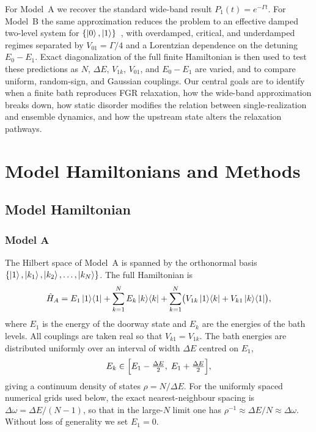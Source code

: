 \documentclass[aps,prx,reprint,showpacs,showkeys,floatfix]{revtex4-2}
\begin{document}
For Model~A we recover the standard wide-band result
$P_1(t)=e^{-\Gamma t}$.  For Model~B the same approximation reduces the
problem to an effective damped two-level system for
$\{\ket{0},\ket{1}\}$~\cite{CohenTannoudji1997}, with overdamped, critical,
and underdamped regimes separated by $V_{01}=\Gamma/4$ and a Lorentzian
dependence on the detuning $E_0-E_1$.  Exact diagonalization of the full
finite Hamiltonian is then used to test these predictions as $N$,
$\Delta E$, $V_{1k}$, $V_{01}$, and $E_0-E_1$ are varied, and to compare
uniform, random-sign, and Gaussian couplings.  Our central goals are to
identify when a finite bath reproduces FGR relaxation, how the wide-band
approximation breaks down, how static disorder modifies the relation between
single-realization and ensemble dynamics, and how the upstream state alters
the relaxation pathways.

\section{Model Hamiltonians and Methods}
\label{sec:models}

\subsection{Model Hamiltonian}

\subsubsection{Model A}

The Hilbert space of Model~A is spanned by the orthonormal basis
$\{\ket{1}, \ket{k_1}, \ket{k_2}, \ldots, \ket{k_N}\}$.
The full Hamiltonian is
\begin{equation}
    \hat{H}_A = E_1\ket{1}\!\bra{1}
              + \sum_{k=1}^{N} E_k\ket{k}\!\bra{k}
              + \sum_{k=1}^{N}\bigl(V_{1k}\ket{1}\!\bra{k}
                                  + V_{k1}\ket{k}\!\bra{1}\bigr),
    \label{eq:HA}
\end{equation}
where $E_1$ is the energy of the doorway state and $E_k$ are the energies of
the bath levels.  All couplings are taken real so that $V_{k1}=V_{1k}$.
The bath energies are distributed uniformly over an interval of width
$\Delta E$ centred on $E_1$,
\begin{equation}
    E_k \in \Bigl[E_1 - \tfrac{\Delta E}{2},\; E_1 + \tfrac{\Delta E}{2}\Bigr],
    \label{eq:Ek}
\end{equation}
giving a continuum density of states $\rho = N/\Delta E$.
For the uniformly spaced numerical grids used below, the exact nearest-neighbour
spacing is $\Delta\omega = \Delta E/(N-1)$, so that in the large-$N$ limit
one has $\rho^{-1}\approx \Delta E/N \approx \Delta\omega$.  Without loss of
generality we set $E_1 = 0$.
\end{document}
